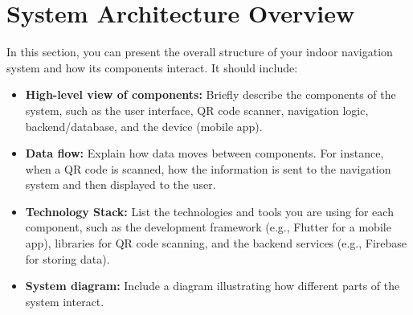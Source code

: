 \color{red}
\section{System Architecture Overview}

In this section, you can present the overall structure of your indoor navigation system and how its components interact. It should include:

\begin{itemize}
\item \textbf{High-level view of components:}
Briefly describe the components of the system, such as the user interface, QR code scanner, navigation logic, backend/database, and the device (mobile app).
\item \textbf{Data flow:}
Explain how data moves between components. For instance, when a QR code is scanned, how the information is sent to the navigation system and then displayed to the user.
\item \textbf{Technology Stack:}
List the technologies and tools you are using for each component, such as the development framework (e.g., Flutter for a mobile app), libraries for QR code scanning, and the backend services (e.g., Firebase for storing data).
\item \textbf{System diagram:}
 Include a diagram illustrating how different parts of the system interact.
\end{itemize}
\color{black}